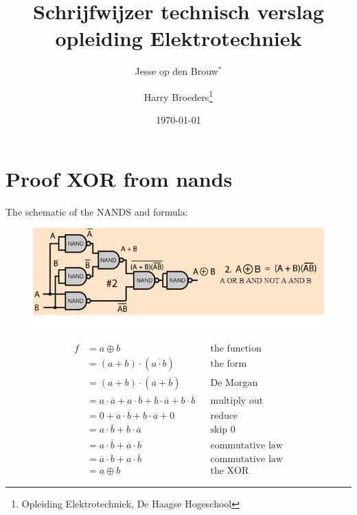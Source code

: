 \documentclass[a4paper,11pt,oneside,fleqn]{article}
\title{Schrijfwijzer technisch verslag opleiding Elektrotechniek}
\author{Jesse op den Brouw$^*$ \and Harry Broeders\thanks{Opleiding Elektrotechniek, De Haagse Hogeschool}}
\date{\today}
\begin{document}
\section*{Proof XOR from nands}

The schematic of the NANDS and formula:

\begin{figure}[!ht]
\includegraphics[scale=0.5]{XOR_from_NAND}
\end{figure}


\begin{equation}
\begin{split}
f &= a \oplus b && \text{the function} \\
  &= (a+b)\cdot (\overline{a\cdot b}) && \text{the form}\\
  &= (a+b)\cdot (\overline{a}+\overline{b}) && \text{De Morgan} \\
  &= a\cdot\overline{a} + a\cdot\overline{b} + b\cdot\overline{a} + b\cdot\overline{b} && \text{multiply out} \\
  &= 0 + a\cdot\overline{b} + b\cdot\overline{a} + 0 && \text{reduce} \\
  &= a\cdot\overline{b} + b\cdot\overline{a} && \text{skip 0} \\
  &= a\cdot\overline{b} + \overline{a}\cdot b && \text{commutative law} \\
  &= \overline{a}\cdot b + a\cdot\overline{b} && \text{commutative law} \\\
  &= a \oplus b && \text{the XOR}
\end{split}
\end{equation}
\end{document}
